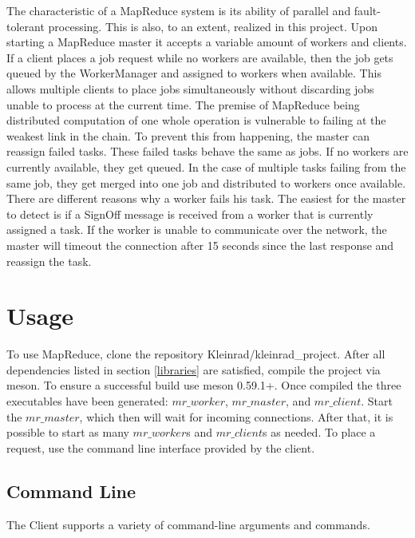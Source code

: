 \documentclass[12pt, letterpaper]{article}
\begin{document}
The characteristic of a MapReduce system is its ability of parallel and fault-tolerant processing. This is also, to an extent, realized in this project.\newline
Upon starting a MapReduce master it accepts a variable amount of workers and clients. If a client places a job request while no workers are available, then the job gets queued by the WorkerManager and assigned to workers when available. This allows multiple clients to place jobs simultaneously without discarding jobs unable to process at the current time.\newline
The premise of MapReduce being distributed computation of one whole operation is vulnerable to failing at the weakest link in the chain. To prevent this from happening, the master can reassign failed tasks. These failed tasks behave the same as jobs. If no workers are currently available, they get queued. In the case of multiple tasks failing from the same job, they get merged into one job and distributed to workers once available.\newline
There are different reasons why a worker fails his task. The easiest for the master to detect is if a SignOff message is received from a worker that is currently assigned a task. If the worker is unable to communicate over the network, the master will timeout the connection after 15 seconds since the last response and reassign the task. 

\section{Usage}
\label{usage}

To use MapReduce, clone the repository Kleinrad/kleinrad\_project. After all dependencies listed in section \ref{libraries} are satisfied, compile the project via meson. To ensure a successful build use meson 0.59.1+. Once compiled the three executables have been generated: $mr\_worker$, $mr\_master$, and $mr\_client$.\newline
Start the $mr\_master$, which then will wait for incoming connections. After that, it is possible to start as many $mr\_worker$s and $mr\_client$s as needed. To place a request, use the command line interface provided by the client.

\subsection{Command Line}
The Client supports a variety of command-line arguments and commands.
\end{document}
